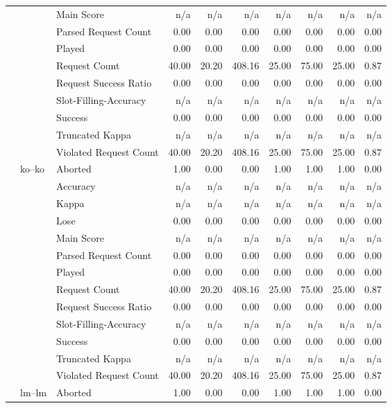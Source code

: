 \begin{tabular}{lllrrrrrrr}
 &  & Main Score & n/a & n/a & n/a & n/a & n/a & n/a & n/a \\
 &  & Parsed Request Count & 0.00 & 0.00 & 0.00 & 0.00 & 0.00 & 0.00 & 0.00 \\
 &  & Played & 0.00 & 0.00 & 0.00 & 0.00 & 0.00 & 0.00 & 0.00 \\
 &  & Request Count & 40.00 & 20.20 & 408.16 & 25.00 & 75.00 & 25.00 & 0.87 \\
 &  & Request Success Ratio & 0.00 & 0.00 & 0.00 & 0.00 & 0.00 & 0.00 & 0.00 \\
 &  & Slot-Filling-Accuracy & n/a & n/a & n/a & n/a & n/a & n/a & n/a \\
 &  & Success & 0.00 & 0.00 & 0.00 & 0.00 & 0.00 & 0.00 & 0.00 \\
 &  & Truncated Kappa & n/a & n/a & n/a & n/a & n/a & n/a & n/a \\
 &  & Violated Request Count & 40.00 & 20.20 & 408.16 & 25.00 & 75.00 & 25.00 & 0.87 \\
\cline{2-10}
 & \multirow[t]{13}{*}{ko--ko} & Aborted & 1.00 & 0.00 & 0.00 & 1.00 & 1.00 & 1.00 & 0.00 \\
 &  & Accuracy & n/a & n/a & n/a & n/a & n/a & n/a & n/a \\
 &  & Kappa & n/a & n/a & n/a & n/a & n/a & n/a & n/a \\
 &  & Lose & 0.00 & 0.00 & 0.00 & 0.00 & 0.00 & 0.00 & 0.00 \\
 &  & Main Score & n/a & n/a & n/a & n/a & n/a & n/a & n/a \\
 &  & Parsed Request Count & 0.00 & 0.00 & 0.00 & 0.00 & 0.00 & 0.00 & 0.00 \\
 &  & Played & 0.00 & 0.00 & 0.00 & 0.00 & 0.00 & 0.00 & 0.00 \\
 &  & Request Count & 40.00 & 20.20 & 408.16 & 25.00 & 75.00 & 25.00 & 0.87 \\
 &  & Request Success Ratio & 0.00 & 0.00 & 0.00 & 0.00 & 0.00 & 0.00 & 0.00 \\
 &  & Slot-Filling-Accuracy & n/a & n/a & n/a & n/a & n/a & n/a & n/a \\
 &  & Success & 0.00 & 0.00 & 0.00 & 0.00 & 0.00 & 0.00 & 0.00 \\
 &  & Truncated Kappa & n/a & n/a & n/a & n/a & n/a & n/a & n/a \\
 &  & Violated Request Count & 40.00 & 20.20 & 408.16 & 25.00 & 75.00 & 25.00 & 0.87 \\
\cline{2-10}
 & \multirow[t]{13}{*}{lm--lm} & Aborted & 1.00 & 0.00 & 0.00 & 1.00 & 1.00 & 1.00 & 0.00 \\

\end{tabular}
